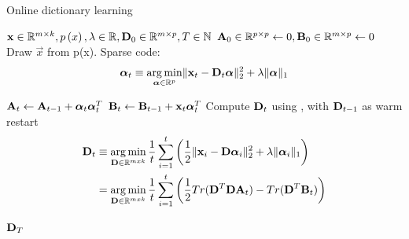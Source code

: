 \begin{algorithm}[H]
\caption[\trainDL]{Online dictionary learning}
\label{alg:trainDL}
\begin{algorithmic}[1]
\REQUIRE $\boldsymbol{\mathrm{x}} \in \mathbb{R}^{m \times k},  p \left( x \right), \lambda \in
\mathbb{R}, \boldsymbol{\mathrm{D}}_0 \in \mathbb{R}^{m \times p}, T \in \mathbb{N}$
\STATE $\boldsymbol{\mathrm{A}}_0 \in \mathbb{R}^{p \times p} \gets  0, \boldsymbol{\mathrm{B}}_0 \in
\mathbb{R}^{m \times p}\gets 0$
\STATE Draw $\vec{x}$ from p(x).
\STATE Sparse code:
\begin{align*} 
\boldsymbol{\mathrm{\alpha}}_t \equiv \operatorname*{arg\,min}_{\boldsymbol{\mathrm{\alpha}}\in\mathbb{R}^{p}}  \lVert \boldsymbol{\mathrm{x}}_t
- \boldsymbol{\mathrm{D}}_t\boldsymbol{\mathrm{\alpha}} \rVert^{2}_{2}  +  \lambda \lVert \boldsymbol{\mathrm{\alpha}}
\rVert_{1}
\end{align*}

\STATE $\boldsymbol{\mathrm{A}}_t \gets \boldsymbol{\mathrm{A}}_{t-1} +
\boldsymbol{\mathrm{\alpha}}_t\boldsymbol{\mathrm{\alpha}}_t^T$\label{alg:Aupdate}
\STATE $\boldsymbol{\mathrm{B}}_t \gets \boldsymbol{\mathrm{B}}_{t-1} +
\boldsymbol{\mathrm{x}}_t\boldsymbol{\mathrm{\alpha}}_t^T$\label{alg:Bupdate}
\STATE Compute $\boldsymbol{\mathrm{D}}_t$ using , with $\boldsymbol{\mathrm{D}}_{t-1}$ as
warm restart 
\begin{equation}
\begin{split}
\boldsymbol{\mathrm{D}}_t  & \equiv \operatorname*{arg\,min}_{\boldsymbol{\mathrm{D}} \in \mathbb{R}^{m x k}}  \frac{1}{t}
\sum_{i=1}^t
\left( \frac{1}{2} \lVert \boldsymbol{\mathrm{x}}_i - \boldsymbol{\mathrm{D}}\boldsymbol{\mathrm{\alpha}}_i \rVert^{2}_{2}  + 
\lambda \lVert
\boldsymbol{\mathrm{\alpha}}_i \rVert_{1} \right) \\
& = \operatorname*{arg\,min}_{\boldsymbol{\mathrm{D}} \in \mathbb{R}^{m x k}}  \frac{1}{t} \sum_{i=1}^t
\left( \frac{1}{2} Tr(\boldsymbol{\mathrm{D}}^T\boldsymbol{\mathrm{D}}\boldsymbol{\mathrm{A}}_t) - Tr(\boldsymbol{\mathrm{D}}^T\boldsymbol{\mathrm{B}}_t)\right)
\label{eq:update}
\end{split}
\end{equation}
 
\ENDFOR
\RETURN $\boldsymbol{\mathrm{D}}_T$
\end{algorithmic}
\end{algorithm}


